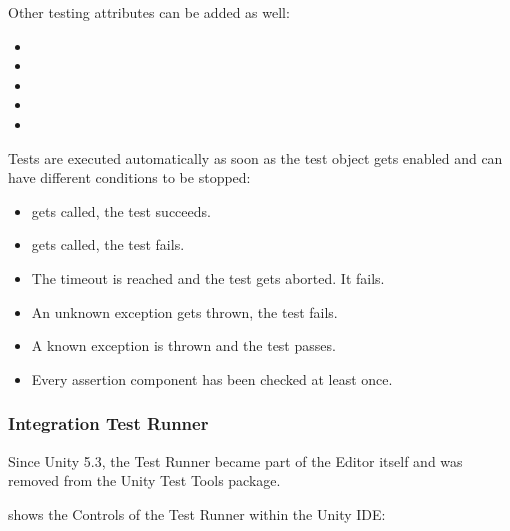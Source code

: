             Other testing attributes can be added as well:
            \begin{itemize}
                \setlength\itemsep{-0.4em}
                \item {}
                \item {}
                \item {}
                \item {}
                \item {}
            \end{itemize}

            Tests are executed automatically as soon as the test object gets enabled 
            and can have different conditions to be stopped:
            \begin{itemize}
                \setlength\itemsep{-0.4em}
                \item {} gets called, the test succeeds.
                \item {} gets called, the test fails.
                \item The timeout is reached and the test gets aborted. It fails.
                \item An unknown exception gets thrown, the test fails.
                \item A known exception is thrown and the test passes.
                \item Every assertion component has been checked at least once.
            \end{itemize}

        \subsubsection{Integration Test Runner} \label{subsubsec:UnityIntTestRunner}
            Since Unity 5.3, the Test Runner became part of the Editor itself and was removed from the Unity Test Tools package.
            
             shows the Controls of the Test Runner within the Unity IDE:

